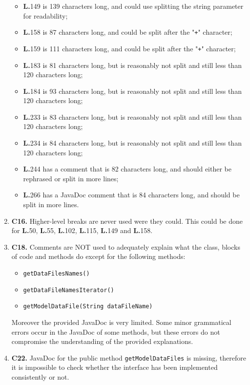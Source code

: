 \begin{enumerate}
\begin{itemize}
	\item \textbf{L.}149 is 139 characters long, and could use splitting the string parameter for readability;
	\item \textbf{L.}158 is 87 characters long, and could be split after the "\texttt{+}" character;
	\item \textbf{L.}159 is 111 characters long, and could be split after the "\texttt{+}" character;
	\item \textbf{L.}183 is 81 characters long, but is reasonably not split and still less than 120 characters long;
	\item \textbf{L.}184 is 93 characters long, but is reasonably not split and still less than 120 characters long;
	\item \textbf{L.}233 is 83 characters long, but is reasonably not split and still less than 120 characters long;
	\item \textbf{L.}234 is 84 characters long, but is reasonably not split and still less than 120 characters long;
	\item \textbf{L.}244 has a comment that is 82 characters long, and should either be rephrased or split in more lines;
	\item \textbf{L.}266 has a JavaDoc comment that is 84 characters long, and should be split in more lines.
	\end{itemize}
\item \textbf{C16.} Higher-level breaks are never used were they could. This could be done for \textbf{L.}50, \textbf{L.}55, \textbf{L.}102, \textbf{L.}115, \textbf{L.}149 and \textbf{L.}158.
\item \textbf{C18.} Comments are NOT used to adequately explain what the class, blocks of code and methods do except for the following methods:
	\begin{itemize}
	\item \texttt{getDataFilesNames()}
	\item \texttt{getDataFileNamesIterator()}
	\item \texttt{getModelDataFile(String dataFileName)}
	\end{itemize}
Moreover the provided JavaDoc is very limited. Some minor grammatical errors occur in the JavaDoc of some methods, but these errors do not compromise the understanding of the provided explanations.
\item \textbf{C22.} JavaDoc for the public method \texttt{getModelDataFiles} is missing, therefore it is impossible to check whether the interface has been implemented consistently or not.

\end{enumerate}
